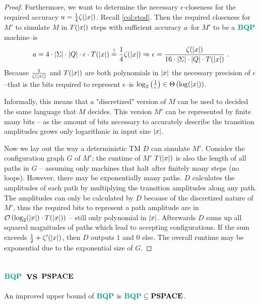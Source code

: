 \begin{theorem}
\begin{proof}
Furthermore, we want to determine the necessary $\epsilon$-closeness for the required accuracy $a=\frac{1}{4}\zeta(\left\vert x\right\vert)$.
Recall \cref{col:etod}.
Then the required closeness for $M'$ to simulate $M$ in $T(\left\vert x\right\vert)$ steps with sufficient accuracy $a$--for $M'$ to be a $\BQP$ machine--is
\begin{equation}
    a
    =4\cdot\left\vert\Sigma\right\vert\cdot\left\vert Q\right\vert\cdot\epsilon\cdot T(\left\vert x\right\vert)
    \overset{!}{=}\frac{1}{4}\zeta(\left\vert x\right\vert)
    \Rightarrow
    \epsilon
    =\frac{\zeta(\left\vert x\right\vert)}{16\cdot\left\vert\Sigma\right\vert\cdot\left\vert Q\right\vert\cdot T(\left\vert x\right\vert)}
    \ .
\end{equation}
Because $\frac{1}{\zeta(\left\vert x\right\vert)}$ and $T(\left\vert x\right\vert)$ are both polynomials in $\left\vert x\right\vert$ the necessary precision of $\epsilon$--that is the bits required to represent $\epsilon$--is $\log_2\left(\frac{1}{\epsilon}\right)\in\Theta\left(\log(\left\vert x\right\vert)\right)$.

Informally, this means that a "discretized" version of $M$ can be used to decided the same language that $M$ decides.
This version $M'$ can be represented by finite many bits -- as the amount of bits necessary to accurately describe the transition amplitudes grows only logarithmic in input size $\left\vert x\right\vert$.

Now we lay out the way a deterministic \ac{TM} $D$ can simulate $M'$.
Consider the configuration graph $G$ of $M'$; the runtime of $M'$ $T(\left\vert x\right\vert)$ is also the length of all paths in $G$ -- assuming only machines that halt after finitely many steps (no loops).
However, there may be exponentially many paths.
$D$ calculates the amplitudes of each path by multiplying the transition amplitudes along any path.
The amplitudes can only be calculated by $D$ because of the discretized nature of $M'$, thus the required bits to represent a path amplitude are in $\mathcal{O}\left(\log_2(\left\vert x\right\vert)\cdot T(\left\vert x\right\vert)\right)$ -- still only polynomial in $\left\vert x\right\vert$.
Afterwards $D$ sums up all squared magnitudes of paths which lead to accepting configurations.
If the sum exceeds $\frac{1}{2}+\zeta'(\left\vert x\right\vert)$, then $D$ outputs $1$ and $0$ else.
The overall runtime may be exponential due to the exponential size of $G$.
\end{proof}
\end{theorem}

\subsection{$\BQP$ vs $\mathbf{PSPACE}$}
An improved upper bound of $\BQP$ is $\BQP\subseteq\PSPACE$.

